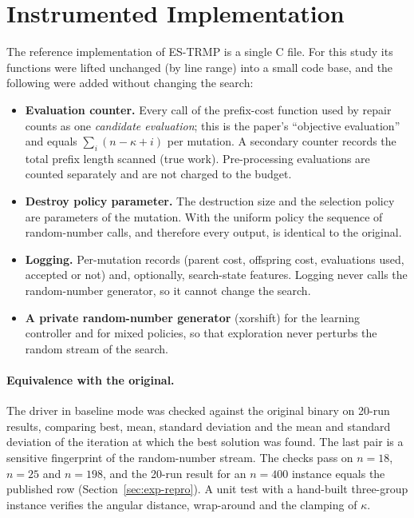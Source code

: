 
\section{Instrumented Implementation}\label{sec:impl}

The reference implementation of ES-TRMP is a single C file. For this study its functions were lifted unchanged (by line range) into a small code base, and the following were added without changing the search:

\begin{itemize}
\item \textbf{Evaluation counter.} Every call of the prefix-cost function used by repair counts as one \emph{candidate evaluation}; this is the paper's \enquote{objective evaluation} and equals $\sum_i(n-\kappa+i)$ per mutation. A secondary counter records the total prefix length scanned (true work). Pre-processing evaluations are counted separately and are not charged to the budget.
\item \textbf{Destroy policy parameter.} The destruction size and the selection policy are parameters of the mutation. With the uniform policy the sequence of random-number calls, and therefore every output, is identical to the original.
\item \textbf{Logging.} Per-mutation records (parent cost, offspring cost, evaluations used, accepted or not) and, optionally, search-state features. Logging never calls the random-number generator, so it cannot change the search.
\item \textbf{A private random-number generator} (xorshift) for the learning controller and for mixed policies, so that exploration never perturbs the random stream of the search.
\end{itemize}

\paragraph{Equivalence with the original.} The driver in baseline mode was checked against the original binary on 20-run results, comparing best, mean, standard deviation and the mean and standard deviation of the iteration at which the best solution was found. The last pair is a sensitive fingerprint of the random-number stream. The checks pass on $n=18$, $n=25$ and $n=198$, and the 20-run result for an $n=400$ instance equals the published row (Section~\ref{sec:exp-repro}). A unit test with a hand-built three-group instance verifies the angular distance, wrap-around and the clamping of $\kappa$.

